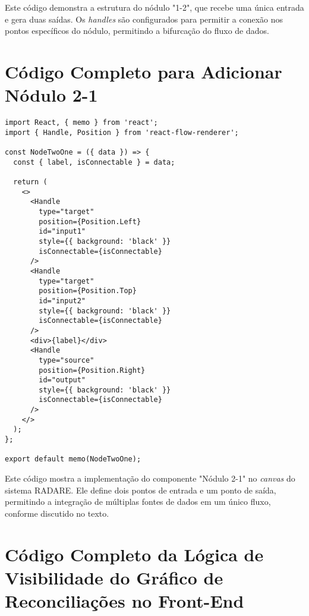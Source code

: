 Este código demonstra a estrutura do nódulo "1-2", que recebe uma única entrada e gera duas saídas. Os \textit{handles} são configurados para permitir a conexão nos pontos específicos do nódulo, permitindo a bifurcação do fluxo de dados.

\chapter{Código Completo para Adicionar Nódulo 2-1}
\label{Cap:NodeTwoOneCode}

\begin{verbatim}
import React, { memo } from 'react';
import { Handle, Position } from 'react-flow-renderer';

const NodeTwoOne = ({ data }) => {
  const { label, isConnectable } = data;

  return (
    <>
      <Handle
        type="target"
        position={Position.Left}
        id="input1"
        style={{ background: 'black' }}
        isConnectable={isConnectable}
      />
      <Handle
        type="target"
        position={Position.Top}
        id="input2"
        style={{ background: 'black' }}
        isConnectable={isConnectable}
      />
      <div>{label}</div>
      <Handle
        type="source"
        position={Position.Right}
        id="output"
        style={{ background: 'black' }}
        isConnectable={isConnectable}
      />
    </>
  );
};

export default memo(NodeTwoOne);
\end{verbatim}

Este código mostra a implementação do componente "Nódulo 2-1" no \textit{canvas} do sistema RADARE. Ele define dois pontos de entrada e um ponto de saída, permitindo a integração de múltiplas fontes de dados em um único fluxo, conforme discutido no texto.

\chapter{Código Completo da Lógica de Visibilidade do Gráfico de Reconciliações no Front-End}
\label{Anexo:HideGraphLogic}

